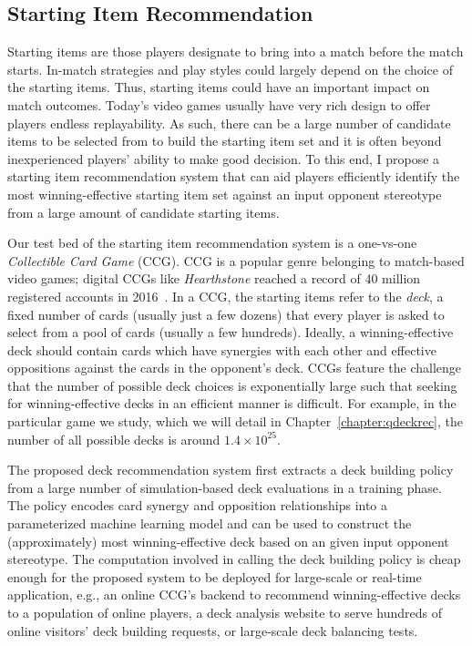 \subsection{Starting Item Recommendation}

Starting items are those players designate to bring into a match before the match starts. In-match strategies and play styles could largely depend on the choice of the starting items. Thus, starting items could have an important impact on match outcomes. Today's video games usually have very rich design to offer players endless replayability. As such, there can be a large number of candidate items to be selected from to build the starting item set and it is often beyond inexperienced players' ability to make good decision. To this end, I propose a starting item recommendation system that can aid players efficiently identify the most winning-effective starting item set against an input opponent stereotype from a large amount of candidate starting items. 

Our test bed of the starting item recommendation system is a one-vs-one \textit{Collectible Card Game} (CCG). CCG is a popular genre belonging to match-based video games; digital CCGs like \textit{Hearthstone} reached a record of 40 million registered accounts in 2016~\cite{hearthstonepopular}. In a CCG, the starting items refer to the \textit{deck}, a fixed number of cards (usually just a few dozens) that every player is asked to select from a pool of cards (usually a few hundreds). Ideally, a winning-effective deck should contain cards which have synergies with each other and effective oppositions against the cards in the opponent's deck. CCGs feature the challenge that the number of possible deck choices is exponentially large such that seeking for winning-effective decks in an efficient manner is difficult. For example, in the particular game we study, which we will detail in Chapter~\ref{chapter:qdeckrec}, the number of all possible decks is around $1.4 \times 10^{25}$. 

The proposed deck recommendation system first extracts a deck building policy from a large number of simulation-based deck evaluations in a training phase. The policy encodes card synergy and opposition relationships into a parameterized machine learning model and can be used to construct the (approximately) most winning-effective deck based on an given input opponent stereotype. The computation involved in calling the deck building policy is cheap enough for the proposed system to be deployed for large-scale or real-time application, e.g., an online CCG's backend to recommend winning-effective decks to a population of online players, a deck analysis website to serve hundreds of online visitors' deck building requests, or large-scale deck balancing tests. 

